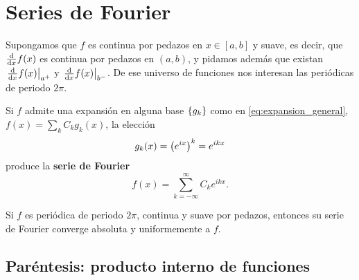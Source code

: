 \section{Series de Fourier}
\label{sec:fourier}

Supongamos que $f$ es continua por pedazos en $x\in[a,b]$ y suave, es decir,
que $\frac{\mathrm{d}}{\mathrm{d}x}f(x)$ es continua por pedazos en $(a,b)$, y pidamos adem\'as que
existan $\left. \frac{\mathrm{d}}{\mathrm{d}x}f(x) \right|_{a^{+}}$ y $\left. \frac{\mathrm{d}}{\mathrm{d}x}f(x) \right|_{b^{-}}$. De ese
universo de funciones nos interesan las peri\'odicas de periodo $2\pi$.

Si $f$ admite una expansi\'on en alguna base $\left\{ g_k \right\}$ como en
\eqref{eq:expansion_general}, $f(x)=\sum_k C_kg_k(x)$, la elecci\'on
\begin{equation}
  \label{eq:base_fourier}
  g_k(x)=\left( e^{ix} \right)^{k}=e^{ikx}
\end{equation}
produce la \textbf{serie de Fourier}
\begin{equation}
  \label{eq:serie_fourier}
  f(x)=\sum_{k=-\infty}^{\infty}C_ke^{ikx} .
\end{equation}

\begin{teorema}[Convergencia]
  \label{teo:convergencia_fourier}
  Si $f$ es peri\'odica de periodo $2\pi$, continua y suave por pedazos,
  entonces su serie de Fourier converge absoluta y uniformemente a $f$.
\end{teorema}

\subsection{Par\'entesis: producto interno de funciones}
\label{subsec:producto_interno_funciones}


